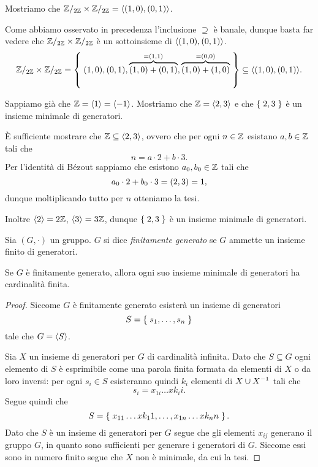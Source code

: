 \begin{example}
    Mostriamo che $\mathbb{Z}/_{2\mathbb{Z}} \times \mathbb{Z}/_{2\mathbb{Z}} = \langle(1, 0), (0, 1)\rangle$.

    Come abbiamo osservato in precedenza l'inclusione $\supseteq$ è banale, dunque basta far vedere che $\mathbb{Z}/_{2\mathbb{Z}} \times \mathbb{Z}/_{2\mathbb{Z}}$ è un sottoinsieme di $\langle(1, 0), (0, 1)\rangle$.
    \[
        \mathbb{Z}/_{2\mathbb{Z}} \times \mathbb{Z}/_{2\mathbb{Z}} = \left\{\;(1, 0), (0, 1), \overbrace{(1, 0) + (0, 1)}^{= (1, 1)}, \overbrace{(1, 0) + (1, 0)}^{= (0, 0)}\;\right\} \subseteq \langle(1, 0), (0, 1)\rangle.
    \]
\end{example}

\begin{example}
    Sappiamo già che $\mathbb{Z} = \langle1\rangle = \langle-1\rangle$. Mostriamo che $\mathbb{Z} = \langle2, 3\rangle$ e che $\left\{\;2, 3\;\right\}$ è un insieme minimale di generatori.

    È sufficiente mostrare che $\mathbb{Z} \subseteq \langle2, 3\rangle$, ovvero che per ogni $n \in \mathbb{Z}$ esistano $a, b \in \mathbb{Z}$ tali che \[
        n = a\cdot 2 + b \cdot 3.    
    \] Per l'identità di Bézout sappiamo che esistono $a_0, b_0 \in \mathbb{Z}$ tali che \[
        a_0\cdot 2 + b_0 \cdot 3 = \left(2, 3\right) = 1,    
    \] dunque moltiplicando tutto per $n$ otteniamo la tesi.

    Inoltre $\langle2\rangle = 2\mathbb{Z}$, $\langle3\rangle = 3\mathbb{Z}$, dunque $\left\{\;2, 3\;\right\}$ è un insieme minimale di generatori.
\end{example}

\begin{definition}
    Sia $(G, \cdot)$ un gruppo. $G$ si dice \emph{finitamente generato} se $G$ ammette un insieme finito di generatori.
\end{definition}

\begin{proposition}
    Se $G$ è finitamente generato, allora ogni suo insieme minimale di generatori ha cardinalità finita.
\end{proposition}
\begin{proof}
    Siccome $G$ è finitamente generato esisterà un insieme di generatori \[
        S = \left\{\;s_1, \dots, s_n\;\right\}    
    \] tale che $G = \langle S\rangle$.

    Sia $X$ un insieme di generatori per $G$ di cardinalità infinita. Dato che $S \subseteq G$ ogni elemento di $S$ è esprimibile come una parola finita formata da elementi di $X$ o da loro inversi: per ogni $s_i \in S$ esisteranno quindi $k_i$ elementi di $X \cup X^{-1}$ tali che \[
        s_i = x_{1i}\dots x{k_ii}.
    \] Segue quindi che \[
        S = \left\{\;x_{11}\dots x{k_11}, \dots, x_{1n}\dots x{k_nn}\;\right\}.
    \] Dato che $S$ è un insieme di generatori per $G$ segue che gli elementi $x_{ij}$ generano il gruppo $G$, in quanto sono sufficienti per generare i generatori di $G$. Siccome essi sono in numero finito segue che $X$ non è minimale, da cui la tesi.
\end{proof}

